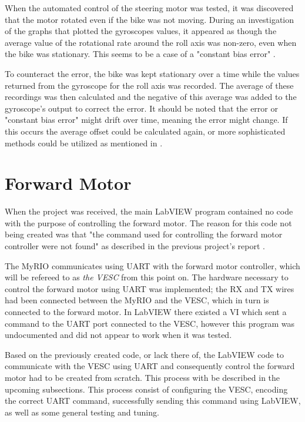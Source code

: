 When the automated control of the steering motor was tested, it was discovered that the motor rotated even if the bike was not moving. During an investigation of the graphs that plotted the gyroscopes values, it appeared as though the average value of the rotational rate around the roll axis was non-zero, even when the bike was stationary. This seems to be a case of a "constant bias error" \cite{Beavers2017TheGyro}.

To counteract the error, the bike was kept stationary over a time while the values returned from the gyroscope for the roll axis was recorded. The average of these recordings was then calculated and the negative of this average was added to the gyroscope's output to correct the error. It should be noted that the error or "constant bias error" might drift over time, meaning the error might change. If this occurs the average offset could be calculated again, or more sophisticated methods could be utilized as mentioned in \cite{Beavers2017TheGyro}.

\section{Forward Motor} \label{method:forward}

When the project was received, the main LabVIEW program contained no code with the purpose of controlling the forward motor. The reason for this code not being created was that "the command used for controlling the forward motor controller were not found" as described in the previous project's report \cite{AronssonKarlsson2022PROJECTAUTOBIKE}.

The MyRIO communicates using UART with the forward motor controller, which will be refereed to as \textit{the VESC} from this point on. The hardware necessary to control the forward motor using UART was implemented; the RX and TX wires had been connected between the MyRIO and the VESC, which in turn is connected to the forward motor. In LabVIEW there existed a VI which sent a command to the UART port connected to the VESC, however this program was undocumented and did not appear to work when it was tested.

Based on the previously created code, or lack there of, the LabVIEW code to communicate with the VESC using UART and consequently control the forward motor had to be created from scratch. This process with be described in the upcoming subsections. This process consist of configuring the VESC, encoding the correct UART command, successfully sending this command using LabVIEW, as well as some general testing and tuning.

